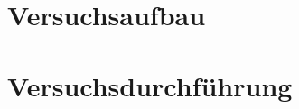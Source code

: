 \section{Versuchsaufbau}
\label{sec:Versuchsaufbau}

\section{Versuchsdurchführung}
\label{sec:Versuchsdurchführung}

